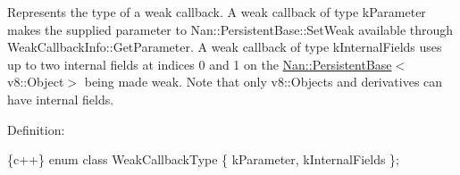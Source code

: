 Represents the type of a weak callback. A weak callback of type {\ttfamily k\+Parameter} makes the supplied parameter to {\ttfamily Nan\+::\+Persistent\+Base\+::\+Set\+Weak} available through {\ttfamily Weak\+Callback\+Info\+::\+Get\+Parameter}. A weak callback of type {\ttfamily k\+Internal\+Fields} uses up to two internal fields at indices 0 and 1 on the {\ttfamily \hyperlink{class_nan_1_1_persistent_base}{Nan\+::\+Persistent\+Base}$<$v8\+::\+Object$>$} being made weak. Note that only {\ttfamily v8\+::\+Object}s and derivatives can have internal fields.

Definition\+:


\begin{DoxyCode}
\{c++\}
enum class WeakCallbackType \{ kParameter, kInternalFields \};
\end{DoxyCode}
 